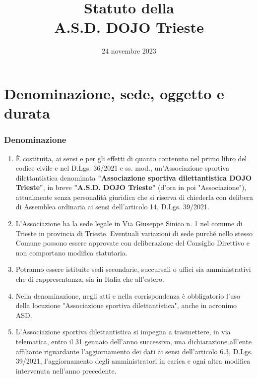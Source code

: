 \documentclass{djtsdoc}
\title{{\normalfont Statuto della}\\[5pt] A.S.D. DOJO Trieste}
\date{24 novembre 2023}
\begin{document}
	\maketitle
	
	\part{Denominazione, sede, oggetto e durata}
	\section{Denominazione}
	\begin{enumerate}
		\item È costituita, ai sensi e per gli effetti di quanto contenuto nel primo libro del codice civile e nel D.Lgs. 36/2021 e ss. mod., un'Associazione sportiva dilettantistica denominata \textbf{"Associazione sportiva dilettantistica DOJO Trieste"}, in breve \textbf{"A.S.D. DOJO Trieste"} (d'ora in poi "Associazione"), attualmente senza personalità giuridica che si riserva di chiederla con delibera di Assemblea ordinaria ai sensi dell'articolo 14, D.Lgs. 39/2021.
		\item L'Associazione ha la sede legale in Via Giuseppe Sinico n. 1 nel comune di Trieste in provincia di Trieste. Eventuali variazioni di sede purché nello stesso Comune possono essere approvate con deliberazione del Consiglio Direttivo e non comportano modifica statutaria.
		\item Potranno essere istituite sedi secondarie, succursali o uffici sia amministrativi che di rappresentanza, sia in Italia che all'estero.
		\item Nella denominazione, negli atti e nella corrispondenza è obbligatorio l'uso della locuzione "Associazione sportiva dilettantistica", anche in acronimo ASD.
		\item L'Associazione sportiva dilettantistica si impegna a trasmettere, in via telematica, entro il 31 gennaio dell'anno successivo, una dichiarazione all'ente affiliante riguardante l'aggiornamento dei dati ai sensi dell'articolo 6.3, D.Lgs. 39/2021, l'aggiornamento degli amministratori in carica e ogni altra modifica intervenuta nell'anno precedente.
	\end{enumerate}
	
\end{document}
